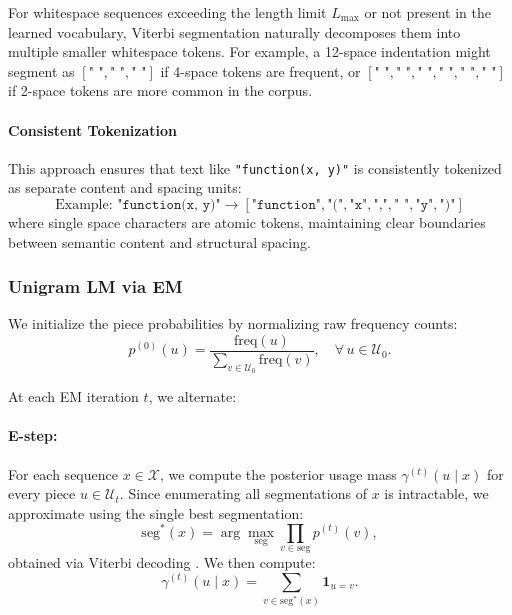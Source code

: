 For whitespace sequences exceeding the length limit $L_{\max}$ or not present in the learned vocabulary, Viterbi segmentation naturally decomposes them into multiple smaller whitespace tokens. For example, a 12-space indentation might segment as $[\texttt{"    "}, \texttt{"    "}, \texttt{"    "}]$ if 4-space tokens are frequent, or $[\texttt{"  "}, \texttt{"  "}, \texttt{"  "}, \texttt{"  "}, \texttt{"  "}, \texttt{"  "}]$ if 2-space tokens are more common in the corpus.

\paragraph{Consistent Tokenization}

This approach ensures that text like \texttt{"function(x, y)"} is consistently tokenized as separate content and spacing units:
\[
\text{Example: } \texttt{"function(x,\ y)"} \rightarrow [\texttt{"function"}, \texttt{"("}, \texttt{"x"}, \texttt{","}, \texttt{" "}, \texttt{"y"}, \texttt{")"}]
\]
where single space characters are atomic tokens, maintaining clear boundaries between semantic content and structural spacing.

\subsubsection{Unigram LM via EM}

We initialize the piece probabilities by normalizing raw frequency counts:
\[
p^{(0)}(u)
= \frac{\mathrm{freq}(u)}{\sum_{v\in\mathcal U_{0}}\mathrm{freq}(v)},
\quad
\forall\,u\in\mathcal U_{0}.
\]

At each EM iteration \(t\), we alternate:

\paragraph{E-step:}

For each sequence \(x\in\mathcal X\), we compute the posterior usage mass \(\gamma^{(t)}(u \mid x)\) for every piece \(u\in \mathcal U_t\). Since enumerating all segmentations of \(x\) is intractable, we approximate using the single best segmentation:
\begin{equation}
\mathrm{seg}^{*}(x)
= \arg\max_{\mathrm{seg}} \prod_{v\in\mathrm{seg}} p^{(t)}(v),
\label{eq:viterbi_decode}
\end{equation}
obtained via Viterbi decoding \cite{kudo2018sentencepiece}. We then compute:
\[
\gamma^{(t)}(u \mid x)
= \sum_{v \in \mathrm{seg}^{*}(x)} \mathbf{1}_{u = v}.
\]

